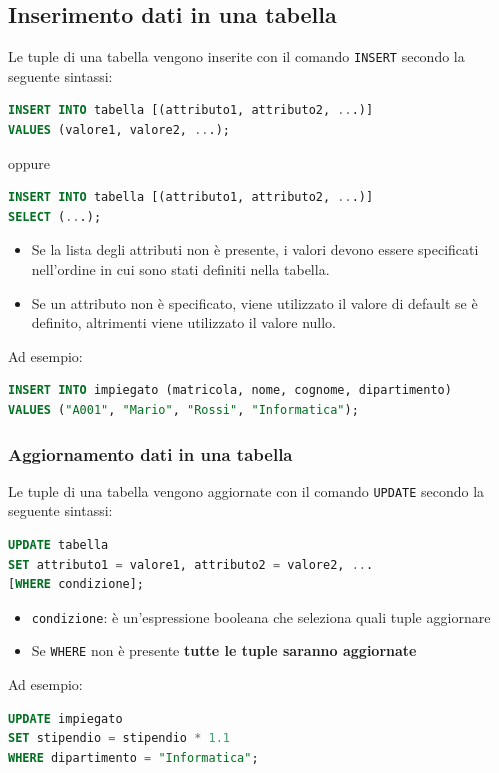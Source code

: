 \documentclass[a4paper]{article}
\begin{document}
\subsection{Inserimento dati in una tabella}
Le tuple di una tabella vengono inserite con il comando \texttt{INSERT} secondo
la seguente sintassi:
\begin{lstlisting}[language=SQL, numbers=none]
INSERT INTO tabella [(attributo1, attributo2, ...)]
VALUES (valore1, valore2, ...);
\end{lstlisting}
oppure
\begin{lstlisting}[language=SQL, numbers=none]
INSERT INTO tabella [(attributo1, attributo2, ...)]
SELECT (...);
\end{lstlisting}
\begin{itemize}
  \item Se la lista degli attributi non è presente, i valori devono essere specificati
    nell'ordine in cui sono stati definiti nella tabella.

  \item Se un attributo non è specificato, viene utilizzato il valore di default se
    è definito, altrimenti viene utilizzato il valore nullo.
\end{itemize}
Ad esempio:
\begin{lstlisting}[language=SQL, numbers=none]
INSERT INTO impiegato (matricola, nome, cognome, dipartimento)
VALUES ("A001", "Mario", "Rossi", "Informatica");
\end{lstlisting}

\subsubsection{Aggiornamento dati in una tabella}
Le tuple di una tabella vengono aggiornate con il comando \texttt{UPDATE} secondo
la seguente sintassi:
\begin{lstlisting}[language=SQL, numbers=none]
UPDATE tabella
SET attributo1 = valore1, attributo2 = valore2, ...
[WHERE condizione];
\end{lstlisting}
\begin{itemize}
  \item \texttt{condizione}: è un'espressione booleana che seleziona quali tuple aggiornare
  \item Se \texttt{WHERE} non è presente \textbf{tutte le tuple saranno aggiornate}
\end{itemize}
Ad esempio:
\begin{lstlisting}[language=SQL, numbers=none]
UPDATE impiegato
SET stipendio = stipendio * 1.1
WHERE dipartimento = "Informatica";
\end{lstlisting}
\end{document}
